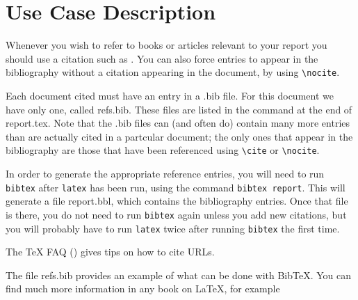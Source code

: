 \chapter{Use Case Description}
Whenever you wish to refer to books or articles relevant to your report
you should use a citation such as \cite{lamport}. You can also force
entries to appear in the bibliography without  a citation appearing in
the document, by using \verb=\nocite=.  

\nocite{boyle,rd-only} 

Each document cited must have an entry in a \textsf{.bib} file. For this
document we have only one, called \textsf{refs.bib}. These files are
listed in the \verb== command at the end of
\textsf{report.tex}. Note that the \textsf{.bib} files can (and often
do) contain many more entries than are actually cited in a partcular
document; the only ones that appear in the bibliography are those that
have been referenced using \verb=\cite= or \verb=\nocite=.

In order to generate the appropriate reference entries, you will need
to run \texttt{bibtex} after \texttt{latex} has been run, using the
command \texttt{bibtex report}. This will generate a file
\textsf{report.bbl}, which contains the bibliography entries. Once
that file is there, you do not need to run \texttt{bibtex} again
unless you add new citations, but you will probably have to run
\texttt{latex} twice after running \texttt{bibtex} the first time.

The \TeX{} FAQ (\cite{url-cite}) gives tips on how to cite URLs.

The file \textsf{refs.bib} provides an example of what can be done
with Bib\TeX. You can find much more information in any book on
\LaTeX, for example 

